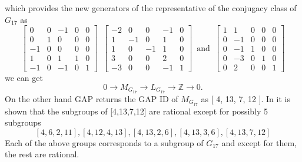 \documentclass{article}
\theoremstyle{plain}
\theoremstyle{definition}
\newcommand{\Z}{\ensuremath{\mathbb{Z}}}
\newcommand{\tand}{\ensuremath{\,\,\, \text{and} \,\,\,}}
\newcommand{\exactseq}[1]{\ensuremath{0 \longrightarrow M_{#1} \longrightarrow L_{#1} \longrightarrow \Z \longrightarrow 0}}
\begin{document}
which provides the new generators of the representative of the conjugacy class of $G_{17}$ as
$$
 \left[ \begin {array}{cccc|c} 0&0&-1&0&0\\  0&1&0&0&0
\\  -1&0&0&0&0\\  1&0&1&1&0
\\ \hline -1&0&-1&0&1\end {array} \right] 
\,\,\,
 \left[ \begin {array}{cccc|c} -2&0&0&-1&0\\  1&-1&0&1
&0\\  1&0&-1&1&0\\  3&0&0&2&0
\\ \hline -3&0&0&-1&1\end {array} \right] 
\tand
 \left[ \begin {array}{cccc|c} 1&1&0&0&0\\  0&-1&0&0&0
\\  0&-1&1&0&0\\  0&-3&0&1&0
\\ \hline 0&2&0&0&1\end {array} \right] 
$$
we can get 
$$\exactseq{G_{17}}.$$
On the other hand GAP returns the GAP ID of $M_{G_{17}}$  as [ 4, 13, 7, 12 ].
In \cite{Nicole1} it is shown that the subgroups of [4,13,7,12] are rational except for possibly 5 subgroups $$[4, 6, 2, 11], [4, 12, 4, 13], [4, 13, 2, 6], [4, 13, 3, 6], [4, 13, 7, 12]$$
Each of the above groups corresponds to a subgroup of $G_{17}$ and except for them, the rest are rational.
\end{document}
